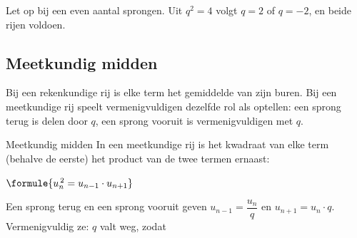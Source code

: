 Let op bij een even aantal sprongen. Uit $q^2 = 4$ volgt $q = 2$ of $q = -2$, en beide rijen voldoen.



\begin{oefeningen}
\end{oefeningen}

\subsection{Meetkundig midden}

Bij een rekenkundige rij is elke term het gemiddelde van zijn buren. Bij een meetkundige rij speelt vermenigvuldigen dezelfde rol als optellen: een sprong terug is delen door $q$, een sprong vooruit is vermenigvuldigen met $q$.

\begin{theorie}
\begin{stelling}{Meetkundig midden}
In een meetkundige rij is het kwadraat van elke term (behalve de eerste) het product van de twee termen ernaast:

\vspace{1mm}
\qquad $\formule{u_n^{\,2} = u_{n-1} \cdot u_{n+1}}$
\end{stelling}

\begin{bewijs}
Een sprong terug en een sprong vooruit geven $u_{n-1} = \dfrac{u_n}{q}$ en $u_{n+1} = u_n \cdot q$. Vermenigvuldig ze: $q$ valt weg, zodat
\end{bewijs}
\end{theorie}

